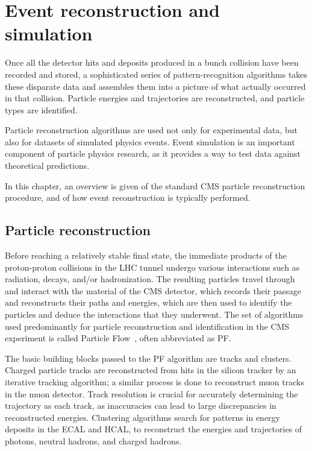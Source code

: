 \chapter{Event reconstruction and simulation\label{sec:recosim}}

Once all the detector hits and deposits produced in a bunch collision have been recorded and stored, a sophisticated series of pattern-recognition algorithms takes these disparate data and assembles them into a picture of what actually occurred in that collision. Particle energies and trajectories are reconstructed, and particle types are identified.

Particle reconstruction algorithms are used not only for experimental data, but also for datasets of simulated physics events. Event simulation is an important component of particle physics research, as it provides a way to test data against theoretical predictions.

In this chapter, an overview is given of the standard CMS particle reconstruction procedure, and of how event reconstruction is typically performed.

\section{Particle reconstruction\label{sec:cms-reco}}
Before reaching a relatively stable final state, the immediate products of the proton-proton collisions in the LHC tunnel undergo various interactions such as radiation, decays, and/or hadronization. The resulting particles travel through and interact with the material of the CMS detector, which records their passage and reconstructs their paths and energies, which are then used to identify the particles and deduce the interactions that they underwent. The set of algorithms used predominantly for particle reconstruction and identification in the CMS experiment is called Particle Flow~\cite{CMS-PAS-PFT-09-001}, often abbreviated as PF.

The basic building blocks passed to the PF algorithm are tracks and clusters. Charged particle tracks are reconstructed from hits in the silicon tracker by an iterative tracking algorithm; a similar process is done to reconstruct muon tracks in the muon detector. Track resolution is crucial for accurately determining the trajectory as each track, as inaccuracies can lead to large discrepancies in reconstructed energies. Clustering algorithms search for patterns in energy deposits in the ECAL and HCAL, to reconstruct the energies and trajectories of photons, neutral hadrons, and charged hadrons.

